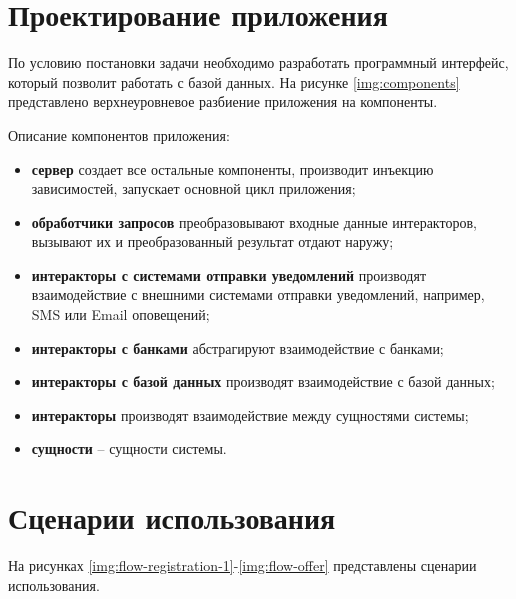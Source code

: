 \clearpage


\newpage


\newpage

\section{Проектирование приложения}
\label{lbl:server-arch}

По условию постановки задачи необходимо разработать программный интерфейс, который позволит работать с базой данных. На рисунке \ref{img:components} представлено верхнеуровневое разбиение приложения на компоненты.


Описание компонентов приложения:
\begin{itemize}
    \item \textbf{сервер} создает все остальные компоненты, производит инъекцию зависимостей, запускает основной цикл приложения;
    \item \textbf{обработчики запросов} преобразовывают входные данные интеракторов, вызывают их и преобразованный результат отдают наружу;
    \item \textbf{интеракторы с системами отправки уведомлений} производят взаимодействие с внешними системами отправки уведомлений, например, SMS или Email оповещений;
    \item \textbf{интеракторы с банками} абстрагируют взаимодействие с банками;
    \item \textbf{интеракторы с базой данных} производят взаимодействие с базой данных;
    \item \textbf{интеракторы} производят взаимодействие между сущностями системы;
    \item \textbf{сущности} -- сущности системы.
\end{itemize}

\section{Сценарии использования}

На рисунках \ref{img:flow-registration-1}-\ref{img:flow-offer} представлены сценарии использования.

